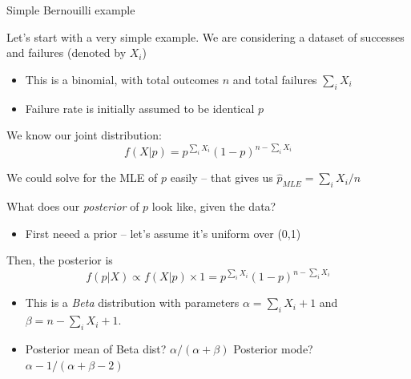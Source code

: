 \documentclass[notes,11pt, aspectratio=169]{beamer}
\newenvironment{wideitemize}{\itemize\addtolength{\itemsep}{10pt}}{\enditemize}
\begin{document}
\begin{frame}{Simple Bernouilli example}
  \begin{wideitemize}
  \item Let's start with a very simple example. We are considering a
    dataset of successes and failures (denoted by $X_{i}$)
    \begin{itemize}
    \item This is a binomial, with total outcomes $n$ and total failures
      $\sum_{i}X_{i}$
    \item Failure rate is initially assumed to be identical $p$
    \end{itemize}
  \item We know our joint distribution:
    $$ f(X | p) = p^{\sum_{i}X_{i}}(1-p)^{n - \sum_{i}X_{i}}$$
  \item We could solve for the MLE of $p$ easily -- that gives us
    $\hat{p}_{MLE} = \sum_{i}X_{i} / n$
  \item What does our \emph{posterior} of $p$ look like, given the data?
    \begin{itemize}
    \item First neeed a prior -- let's assume it's uniform over (0,1)
    \end{itemize}
  \item Then, the posterior is
    $$ f(p | X) \propto f(X | p) \times 1  = p^{\sum_{i}X_{i}}(1-p)^{n - \sum_{i}X_{i}}$$
    \begin{itemize}
    \item This is a \emph{Beta} distribution with
      parameters $\alpha = \sum_{i}X_{i} + 1$ and
      $\beta = n - \sum_{i}X_{i} + 1$.
    \item Posterior mean of Beta dist? $\alpha / (\alpha + \beta)$
      Posterior mode? $\alpha - 1 / (\alpha + \beta - 2)$
    \end{itemize}
  \end{wideitemize}
\end{frame}
\end{document}
